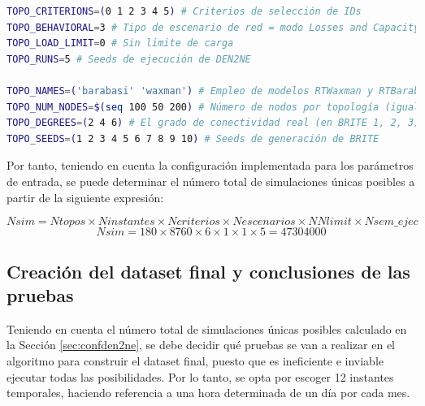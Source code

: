 \vspace{3mm}

\begin{lstlisting}[language=bash, style=Consola, caption={Configuración de los parámetros de entrada en el script de automatización de \acrshort{den2ne}}]
TOPO_CRITERIONS=(0 1 2 3 4 5) # Criterios de selección de IDs
TOPO_BEHAVIORAL=3 # Tipo de escenario de red = modo Losses and Capacity (3)         
TOPO_LOAD_LIMIT=0 # Sin limite de carga
TOPO_RUNS=5 # Seeds de ejecución de DEN2NE

TOPO_NAMES=('barabasi' 'waxman') # Empleo de modelos RTWaxman y RTBarabasi (igual que BRITE)
TOPO_NUM_NODES=$(seq 100 50 200) # Número de nodos por topología (igual que BRITE)
TOPO_DEGREES=(2 4 6) # El grado de conectividad real (en BRITE 1, 2, 3)
TOPO_SEEDS=(1 2 3 4 5 6 7 8 9 10) # Seeds de generación de BRITE
\end{lstlisting}

\vspace{3mm}

Por tanto, teniendo en cuenta la configuración implementada para los parámetros de entrada, se puede determinar el número total de simulaciones únicas posibles a partir de la siguiente expresión:

    \[\textit{Nsim} = \textit{Ntopos} \times \textit{Ninstantes} \times \textit{Ncriterios} 
    \times \textit{Nescenarios} \times \textit{NNlimit} \times \textit{Nsem\_ejec}\]
    \[\textit{Nsim} = 180 \times 8760 \times 6 \times 1 \times 1 \times 5 = 47304000\] 

\pagebreak 

\subsection{Creación del dataset final y conclusiones de las pruebas}
\label{sec:datasetfinal}

Teniendo en cuenta el número total de simulaciones únicas posibles calculado en la Sección \ref{sec:confden2ne}, se debe decidir qué pruebas se van a realizar en el algoritmo para construir el dataset final, puesto que es ineficiente e inviable ejecutar todas las posibilidades. Por lo tanto, se opta por escoger 12 instantes temporales, haciendo referencia a una hora determinada de un día por cada mes. 

\vspace{3mm}

